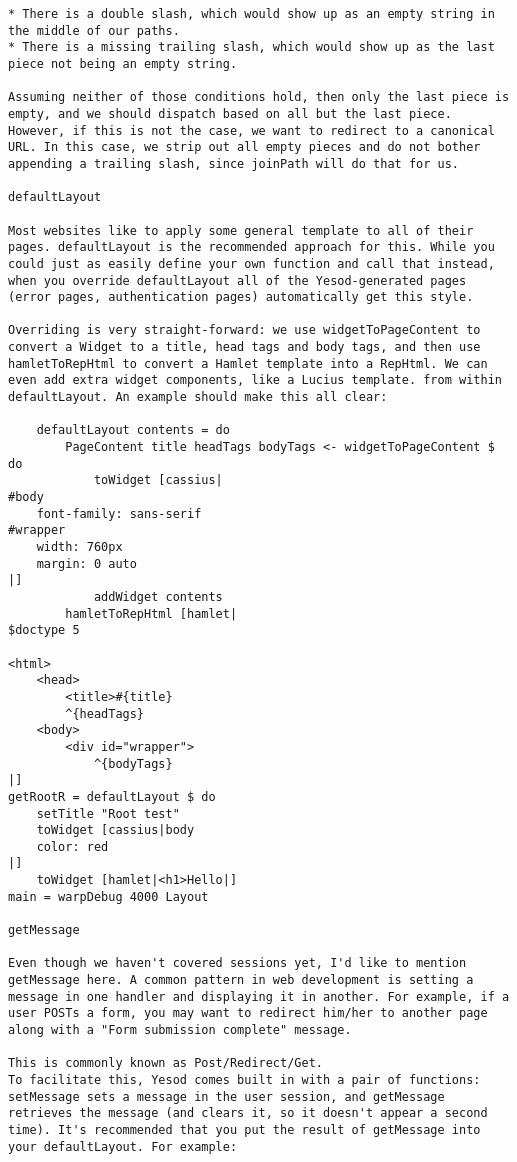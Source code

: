 \begin{lstlisting}
* There is a double slash, which would show up as an empty string in the middle of our paths.
* There is a missing trailing slash, which would show up as the last piece not being an empty string.

Assuming neither of those conditions hold, then only the last piece is empty, and we should dispatch based on all but the last piece. However, if this is not the case, we want to redirect to a canonical URL. In this case, we strip out all empty pieces and do not bother appending a trailing slash, since joinPath will do that for us.

defaultLayout

Most websites like to apply some general template to all of their pages. defaultLayout is the recommended approach for this. While you could just as easily define your own function and call that instead, when you override defaultLayout all of the Yesod-generated pages (error pages, authentication pages) automatically get this style.

Overriding is very straight-forward: we use widgetToPageContent to convert a Widget to a title, head tags and body tags, and then use hamletToRepHtml to convert a Hamlet template into a RepHtml. We can even add extra widget components, like a Lucius template. from within defaultLayout. An example should make this all clear:

    defaultLayout contents = do
        PageContent title headTags bodyTags <- widgetToPageContent $ do
            toWidget [cassius|
#body
    font-family: sans-serif
#wrapper
    width: 760px
    margin: 0 auto
|]
            addWidget contents
        hamletToRepHtml [hamlet|
$doctype 5

<html>
    <head>
        <title>#{title}
        ^{headTags}
    <body>
        <div id="wrapper">
            ^{bodyTags}
|]
getRootR = defaultLayout $ do
    setTitle "Root test"
    toWidget [cassius|body
    color: red
|]
    toWidget [hamlet|<h1>Hello|]
main = warpDebug 4000 Layout

getMessage

Even though we haven't covered sessions yet, I'd like to mention getMessage here. A common pattern in web development is setting a message in one handler and displaying it in another. For example, if a user POSTs a form, you may want to redirect him/her to another page along with a "Form submission complete" message.

This is commonly known as Post/Redirect/Get.
To facilitate this, Yesod comes built in with a pair of functions: setMessage sets a message in the user session, and getMessage retrieves the message (and clears it, so it doesn't appear a second time). It's recommended that you put the result of getMessage into your defaultLayout. For example:


\end{lstlisting}
